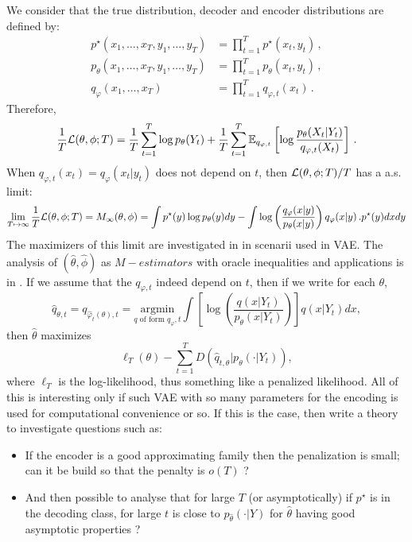 \documentclass{article}
\newcommand{\1}{\mathbbm{1}}
\newcommand{\E}{\mathbb{E}}
\begin{document}
We consider that the true distribution, decoder and encoder distributions are defined by:
\begin{align*}
p^{\star}(x_{1},\ldots,x_{T},y_{1},\ldots,y_{T})&=\prod_{t=1}^{T}p^{\star}(x_{t},y_{t})\,,\\
p_{\theta}(x_{1},\ldots,x_{T},y_{1},\ldots,y_{T})&=\prod_{t=1}^{T}p_{\theta}(x_{t},y_{t})\,,\\
q_{\varphi}(x_{1},\ldots,x_{T})&=\prod_{t=1}^{T}q_{\varphi,t}(x_{t})\,.
\end{align*}
Therefore,
$$
\frac{1}{T}{\cal L}(\theta,\phi; T) = \frac{1}{T}\sum_{t=1}^T\log p_\theta(Y_t) + \frac{1}{T}\sum_{t=1}^T\E_{q_{\varphi,t}}\left[\log \frac{p_\theta(X_t|Y_t)}{q_{\varphi,t}(X_t)}\right]\,.
$$
When $q_{\varphi,t}(x_{t})=q_{\varphi}(x_{t}|y_t)$ does not depend on $t$, then ${\cal L}(\theta,\phi; T)/T$ has a a.s. limit:
$$
\lim_{T\mapsto \infty}\frac{1}{T}{\cal L}(\theta,\phi; T) = M_{\infty}(\theta,\phi)=\int p^{\star}(y)\log p_{\theta}(y) dy - \int \log \left(\frac{q_{\varphi}(x\vert y)}{p_{\theta}(x \vert y) } \right)q_{\varphi}(x\vert y)\,.
p^{\star}(y)dxdy
$$
The maximizers of this limit are investigated in \cite{koehler2021variational} in scenarii used in VAE.  The analysis of $(\widehat{\theta},\widehat{\phi})$ as $M-estimators$ with oracle inequalities and applications is in \cite{tang21a}.
If we assume that the $q_{\varphi,t}$ indeed depend on $t$, then if we write for each $\theta$,
$$
\widehat{q}_{\theta,t}=q_{\widehat{\varphi}_{t}(\theta),t}= \underset{{q \text{ of form }q_{\varphi},t}}{\mathrm{argmin}} \int  \left[\log \left(\frac{q(x\vert Y_{t})}{p_{\theta}(x \vert Y_{t}) } \right)\right]q(x\vert Y_{t})dx,
$$
then $\widehat{\theta}$ maximizes
$$
\ell_{T}(\theta)-\sum_{t=1}^{T} D\left(\widehat{q}_{t,\theta} \vert p_{\theta}(\cdot \vert Y_{t})\right),
$$
where $\ell_{T}$ is the log-likelihood, thus something like a penalized likelihood. All of this is  interesting only if such VAE with so many parameters for the encoding   is used for computational convenience or so. If this is the case, then write a theory to investigate questions such as:
\begin{itemize}
\item If the encoder is a good approximating family then the penalization is small; can it be build so that the penalty is $o(T)$ ? 
\item
And then possible to analyse that for large $T$ (or asymptotically) if $p^{\star}$ is in the decoding class,  for large $t$ is close to $p_{\widehat{\theta}}(\cdot \vert Y)$ for $\widehat{\theta}$ having good asymptotic properties ?
\end{itemize}
\end{document}
